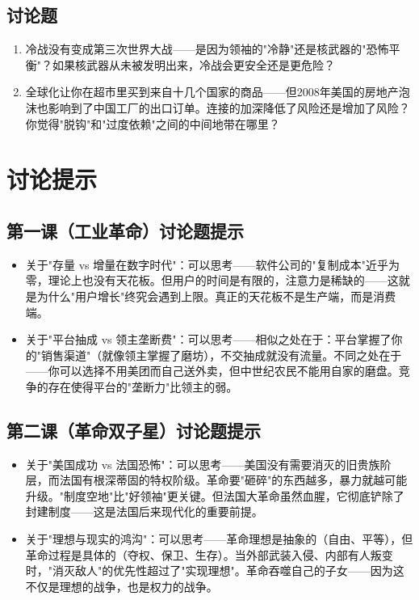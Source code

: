 \documentclass[a4paper,12pt]{ctexart}
\begin{document}
\subsection*{讨论题}
\begin{enumerate}
  \item 冷战没有变成第三次世界大战——是因为领袖的"冷静"还是核武器的"恐怖平衡"？如果核武器从未被发明出来，冷战会更安全还是更危险？
  \item 全球化让你在超市里买到来自十几个国家的商品——但2008年美国的房地产泡沫也影响到了中国工厂的出口订单。连接的加深降低了风险还是增加了风险？你觉得"脱钩"和"过度依赖"之间的中间地带在哪里？
\end{enumerate}

\section*{讨论提示}

\subsection*{第一课（工业革命）讨论题提示}
\begin{itemize}
  \item 关于"存量 vs 增量在数字时代"：可以思考——软件公司的"复制成本"近乎为零，理论上也没有天花板。但用户的时间是有限的，注意力是稀缺的——这就是为什么"用户增长"终究会遇到上限。真正的天花板不是生产端，而是消费端。
  \item 关于"平台抽成 vs 领主垄断费"：可以思考——相似之处在于：平台掌握了你的"销售渠道"（就像领主掌握了磨坊），不交抽成就没有流量。不同之处在于——你可以选择不用美团而自己送外卖，但中世纪农民不能用自家的磨盘。竞争的存在使得平台的"垄断力"比领主的弱。
\end{itemize}

\subsection*{第二课（革命双子星）讨论题提示}
\begin{itemize}
  \item 关于"美国成功 vs 法国恐怖"：可以思考——美国没有需要消灭的旧贵族阶层，而法国有根深蒂固的特权阶级。革命要"砸碎"的东西越多，暴力就越可能升级。"制度空地"比"好领袖"更关键。但法国大革命虽然血腥，它彻底铲除了封建制度——这是法国后来现代化的重要前提。
  \item 关于"理想与现实的鸿沟"：可以思考——革命理想是抽象的（自由、平等），但革命过程是具体的（夺权、保卫、生存）。当外部武装入侵、内部有人叛变时，"消灭敌人"的优先性超过了"实现理想"。革命吞噬自己的子女——因为这不仅是理想的战争，也是权力的战争。
\end{itemize}
\end{document}
